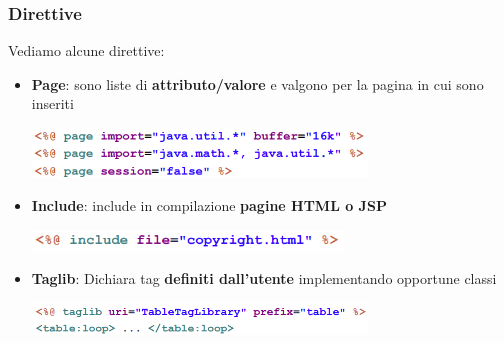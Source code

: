 \documentclass[12pt]{article}
\begin{document}
\subsubsection{Direttive}
Vediamo alcune direttive:
\begin{itemize}
    \item \textbf{Page}: sono liste di \textbf{attributo/valore} e valgono per la pagina in cui sono inseriti
    \begin{center}
        \includegraphics[width = 0.70\textwidth]{Images/193.png}
    \end{center}
    \item \textbf{Include}: include in compilazione \textbf{pagine HTML o JSP}
    \begin{center}
        \includegraphics[width = 0.65\textwidth]{Images/194.png}
    \end{center}
    \item \textbf{Taglib}: Dichiara tag \textbf{definiti dall'utente} implementando opportune classi
    \begin{center}
        \includegraphics[width = 0.70\textwidth]{Images/195.png}
    \end{center}
\end{itemize}
\end{document}
